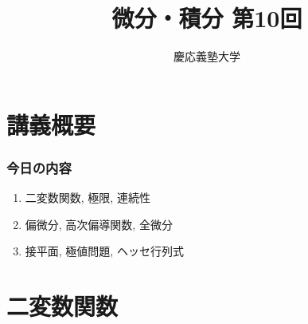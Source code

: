 \documentclass[dvipdfmx,cjk,10.2pt]{beamer}
\theoremstyle{definition}
\begin{document}
\title{微分・積分 第10回} 
\author{慶応義塾大学}            %
\date{}



\begin{frame}                  %
\titlepage                     %
\end{frame}








\section{講義概要}


\begin{frame}
\frametitle{今日の内容}



\begin{enumerate}
\item 二変数関数, 極限, 連続性
\item 偏微分, 高次偏導関数, 全微分
\item 接平面, 極値問題, ヘッセ行列式
\end{enumerate} 



\end{frame}









\section{二変数関数}
\end{document}
